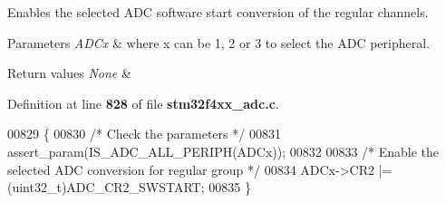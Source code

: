 Enables the selected A\+DC software start conversion of the regular channels. 


\begin{DoxyParams}{Parameters}
{\em A\+D\+Cx} & where x can be 1, 2 or 3 to select the A\+DC peripheral. \\
\hline
\end{DoxyParams}

\begin{DoxyRetVals}{Return values}
{\em None} & \\
\hline
\end{DoxyRetVals}


Definition at line \textbf{ 828} of file \textbf{ stm32f4xx\+\_\+adc.\+c}.


\begin{DoxyCode}
00829 \{
00830   \textcolor{comment}{/* Check the parameters */}
00831   assert_param(IS_ADC_ALL_PERIPH(ADCx));
00832   
00833   \textcolor{comment}{/* Enable the selected ADC conversion for regular group */}
00834   ADCx->CR2 |= (uint32\_t)ADC_CR2_SWSTART;
00835 \}
\end{DoxyCode}
